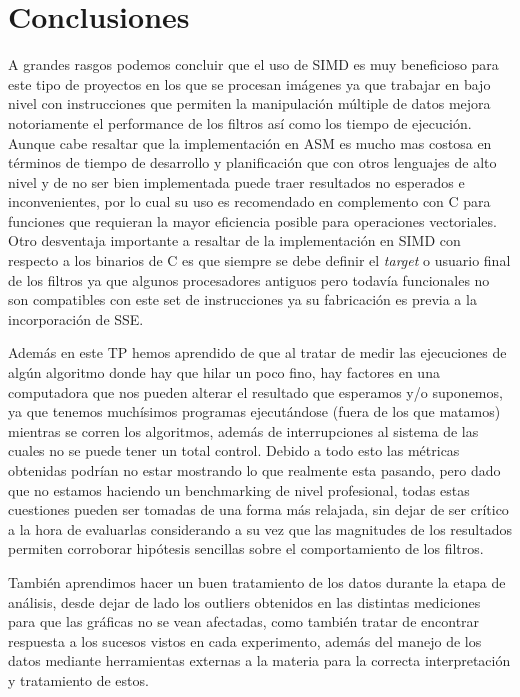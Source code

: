 \documentclass[a4paper]{article}
\begin{document}
\newpage
\section{Conclusiones}

A grandes rasgos podemos concluir que el uso de SIMD es muy beneficioso para este tipo de proyectos en los que se procesan imágenes ya que trabajar en bajo nivel con instrucciones que permiten la manipulación múltiple de datos mejora notoriamente el performance de los filtros así como los tiempo de ejecución. Aunque cabe resaltar que la implementación en ASM es mucho mas costosa en términos de tiempo de desarrollo y planificación que con otros lenguajes de alto nivel y de no ser bien implementada puede traer resultados no esperados e inconvenientes, por lo cual su uso es recomendado en complemento con C para funciones que requieran la mayor eficiencia posible para operaciones vectoriales. Otro desventaja importante a resaltar de la  implementación en SIMD con respecto a los binarios de C es que siempre se debe definir el \emph{target} o usuario final de los filtros ya que algunos procesadores antiguos pero todavía funcionales no son compatibles con este set de instrucciones ya su fabricación es previa a la incorporación de SSE. 

Además en este TP hemos aprendido de que al tratar de medir las ejecuciones de algún algoritmo donde hay que hilar un poco fino, hay factores en una computadora que nos pueden alterar el resultado que esperamos y/o suponemos, ya que tenemos muchísimos programas ejecutándose (fuera de los que matamos) mientras se corren los algoritmos, además de interrupciones al sistema de las cuales no se puede tener un total control. Debido a todo esto las métricas obtenidas podrían no estar mostrando lo que realmente esta pasando, pero dado que no estamos haciendo un benchmarking de nivel profesional, todas estas cuestiones pueden ser tomadas de una forma más relajada, sin dejar de ser crítico a la hora de evaluarlas considerando a  su vez que las magnitudes de los resultados permiten corroborar hipótesis sencillas sobre el comportamiento de los filtros.

También aprendimos hacer un buen tratamiento de los datos durante la etapa de análisis, desde dejar de lado los outliers obtenidos en las distintas mediciones para que las gráficas no se vean afectadas, como también tratar de encontrar respuesta a los sucesos vistos en cada experimento, además del manejo de los datos mediante herramientas externas a la materia para la correcta interpretación y tratamiento de estos.
\end{document}
